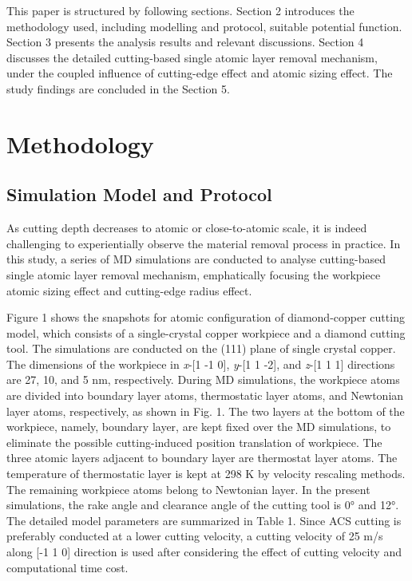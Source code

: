 \documentclass{article}
\begin{document}
This paper is structured by following sections. Section 2 introduces the methodology used, including modelling and protocol, suitable potential function. Section 3 presents the analysis results and relevant discussions. Section 4 discusses the detailed cutting-based single atomic layer removal mechanism, under the coupled influence of cutting-edge effect and atomic sizing effect. The study findings are concluded in the Section 5.

\section*{Methodology}

\subsection*{Simulation Model and Protocol}

As cutting depth decreases to atomic or close-to-atomic scale, it is indeed challenging to experientially observe the material removal process in practice. In this study, a series of MD simulations are conducted to analyse cutting-based single atomic layer removal mechanism, emphatically focusing the workpiece atomic sizing effect and cutting-edge radius effect.

Figure 1 shows the snapshots for atomic configuration of diamond-copper cutting model, which consists of a single-crystal copper workpiece and a diamond cutting tool. The simulations are conducted on the (111) plane of single crystal copper. The dimensions of the workpiece in \emph{x}-[1 -1 0], \emph{y}-[1 1 -2], and \emph{z}-[1 1 1] directions are 27, 10, and 5 nm, respectively. During MD simulations, the workpiece atoms are divided into boundary layer atoms, thermostatic layer atoms, and Newtonian layer atoms, respectively, as shown in Fig. 1. The two layers at the bottom of the workpiece, namely, boundary layer, are kept fixed over the MD simulations, to eliminate the possible cutting-induced position translation of workpiece. The three atomic layers adjacent to boundary layer are thermostat layer atoms. The temperature of thermostatic layer is kept at 298 K by velocity rescaling methods. The remaining workpiece atoms belong to Newtonian layer. In the present simulations, the rake angle and clearance angle of the cutting tool is 0° and 12°. The detailed model parameters are summarized in Table 1. Since ACS cutting is preferably conducted at a lower cutting velocity, a cutting velocity of 25 m/s along [-1 1 0] direction is used after considering the effect of cutting velocity and computational time cost.
\end{document}
